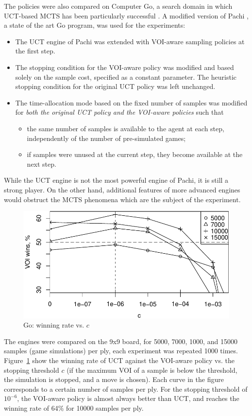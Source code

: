 \documentclass[]{article}
\begin{document}
The policies were also compared on Computer Go, a  search domain
in which UCT-based MCTS has been particularly successful
\cite{Gelly.mogo}. A modified version of Pachi \cite{Braudis.pachi}, a state of the art
Go program, was used for the experiments:
\begin{itemize}
\item The UCT engine of Pachi was extended with VOI-aware sampling
  policies at the first step. 
\item The stopping condition for the VOI-aware policy was
  modified and based solely on the sample cost, specified as
  a constant parameter. The heuristic stopping condition for the
  original UCT policy was left unchanged.
\item The time-allocation mode based on the fixed number of samples
  was modified for \textit{both the original UCT policy and the VOI-aware
  policies} such that 
  \begin{itemize}
    \item the same number of samples is available to
      the agent at each step, independently of the number of pre-simulated
      games;  
    \item if samples were unused at the current step,
      they become available at the next step. 
  \end{itemize}
\end{itemize}
While the UCT engine is not the most powerful engine of Pachi, it is still a strong
player. On the other hand, additional features of more advanced
engines would obstruct the MCTS phenomena which are the subject of
the experiment.
\begin{figure}[h!]
\centering
\includegraphics[scale=0.6]{uctvoi.pdf}
\caption{Go: winning rate vs. $c$}
\label{fig:uctvoi}
\end{figure}
The engines were compared on the 9x9 board, for 5000, 7000, 1000, and
15000 samples (game simulations) per ply, each experiment was repeated
1000 times. Figure~\ref{fig:uctvoi}
show the winning rate of UCT against the VOI-aware policy
vs. the stopping threshold $c$ (if the maximum VOI of a sample is below
the threshold, the simulation is stopped, and a move is chosen). Each
curve in the figure corresponds to a certain number of samples per
ply. For the stopping threshold of $10^{-6}$, the VOI-aware policy
is almost always better than UCT, and  reaches the winning rate of
64\% for 10000 samples per ply.
\end{document}
